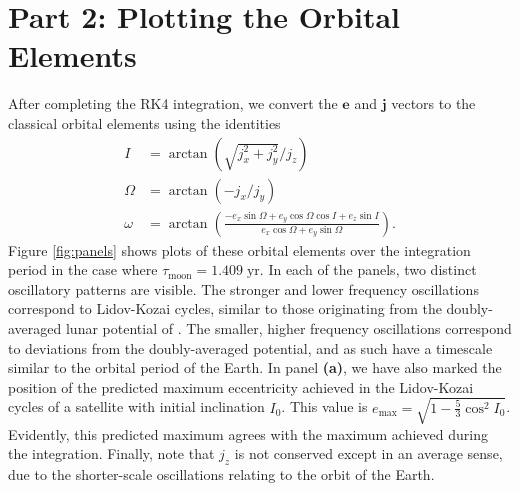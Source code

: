 \documentclass[11pt]{article}
\newcommand{\evec}{\mathbf{e}}
\newcommand{\jvec}{\mathbf{j}}
\begin{document}
\section*{Part 2: Plotting the Orbital Elements}
After completing the RK4 integration, we convert the $\evec$ and $\jvec$ vectors to the classical orbital elements using the identities
\begin{align}
    I &= \arctan \left( \sqrt{j_x^2 + j_y^2} / j_z \right) \label{eq:I} \\
    \Omega &= \arctan(-j_x / j_y) \label{eq:Omega} \\
    \omega &= \arctan \left( \frac{-e_x \sin \Omega + e_y \cos \Omega \cos I + e_z \sin I}{e_x \cos \Omega + e_y \sin \Omega} \right) \label{eq:omega}.
\end{align}
Figure \ref{fig:panels} shows plots of these orbital elements over the integration period in the case where $\tau_{\mathrm{moon}} = 1.409 \; \mathrm{yr}$. In each of the panels, two distinct oscillatory patterns are visible. The stronger and lower frequency oscillations correspond to Lidov-Kozai cycles, similar to those originating from the doubly-averaged lunar potential of \textcite{tremaine2014}. The smaller, higher frequency oscillations correspond to deviations from the doubly-averaged potential, and as such have a timescale similar to the orbital period of the Earth. In panel \textbf{(a)}, we have also marked the position of the predicted maximum eccentricity achieved in the Lidov-Kozai cycles of a satellite with initial inclination $I_0$. This value is $e_\mathrm{max} = \sqrt{1 - \tfrac{5}{3} \cos^2 I_0}$. Evidently, this predicted maximum agrees with the maximum achieved during the integration. Finally, note that $j_z$ is not conserved except in an average sense, due to the shorter-scale oscillations relating to the orbit of the Earth.
\end{document}

